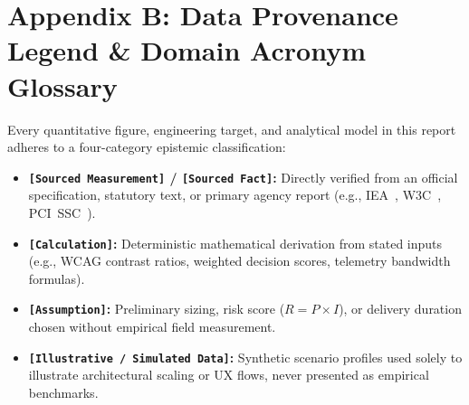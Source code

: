 \vspace{6pt}

\section*{Appendix B: Data Provenance Legend \& Domain Acronym Glossary}

Every quantitative figure, engineering target, and analytical model in this report adheres to a four-category epistemic classification:
\begin{itemize}[leftmargin=12pt, itemsep=1.5pt, topsep=2pt]
  \item \textbf{\texttt{[Sourced Measurement]} / \texttt{[Sourced Fact]}:} Directly verified from an official specification, statutory text, or primary agency report (e.g., IEA~\cite{iea2025gev}, W3C~\cite{w3c2023wcag22}, PCI~SSC~\cite{pcissc2024pcidss401}).
  \item \textbf{\texttt{[Calculation]}:} Deterministic mathematical derivation from stated inputs (e.g., WCAG contrast ratios, weighted decision scores, telemetry bandwidth formulas).
  \item \textbf{\texttt{[Assumption]}:} Preliminary sizing, risk score ($R = P \times I$), or delivery duration chosen without empirical field measurement.
  \item \textbf{\texttt{[Illustrative / Simulated Data]}:} Synthetic scenario profiles used solely to illustrate architectural scaling or UX flows, never presented as empirical benchmarks.
\end{itemize}

